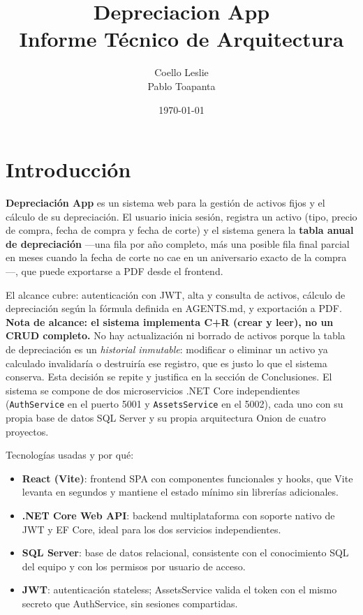 \documentclass[11pt,a4paper]{article}
\title{Depreciacion App \\ \large Informe Técnico de Arquitectura}
\author{Coello Leslie \\ Pablo Toapanta}
\date{\today}
\begin{document}
\maketitle
\tableofcontents
\newpage
\section{Introducción}

\textbf{Depreciación App} es un sistema web para la gestión de activos fijos y
el cálculo de su depreciación. El usuario inicia sesión, registra un activo
(tipo, precio de compra, fecha de compra y fecha de corte) y el sistema
genera la \textbf{tabla anual de depreciación} —una fila por año completo,
más una posible fila final parcial en meses cuando la fecha de corte no cae
en un aniversario exacto de la compra—, que puede exportarse a PDF desde el
frontend.

El alcance cubre: autenticación con JWT, alta y consulta de activos, cálculo de
depreciación según la fórmula definida en AGENTS.md, y exportación a PDF.
\textbf{Nota de alcance: el sistema implementa C+R (crear y leer), no un CRUD
completo.} No hay actualización ni borrado de activos porque la tabla de
depreciación es un \emph{historial inmutable}: modificar o eliminar un activo
ya calculado invalidaría o destruiría ese registro, que es justo lo que el
sistema conserva. Esta decisión se repite y justifica en la sección de
Conclusiones. El
sistema se compone de dos microservicios .NET Core independientes
(\texttt{AuthService} en el puerto 5001 y \texttt{AssetsService} en el 5002),
cada uno con su propia base de datos SQL Server y su propia arquitectura
Onion de cuatro proyectos.

Tecnologías usadas y por qué:

\begin{itemize}
    \item \textbf{React (Vite)}: frontend SPA con componentes funcionales y
    hooks, que Vite levanta en segundos y mantiene el estado mínimo sin
    librerías adicionales.
    \item \textbf{.NET Core Web API}: backend multiplataforma con soporte
    nativo de JWT y EF Core, ideal para los dos servicios independientes.
    \item \textbf{SQL Server}: base de datos relacional, consistente con el
    conocimiento SQL del equipo y con los permisos por usuario de acceso.
    \item \textbf{JWT}: autenticación stateless; AssetsService valida el
    token con el mismo secreto que AuthService, sin sesiones compartidas.
\end{itemize}
\end{document}
